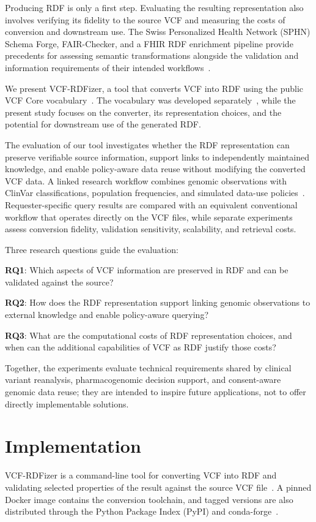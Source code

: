 \documentclass[pdflatex,sn-mathphys-num,referee]{sn-jnl}
\begin{document}
Producing RDF is only a first step.
Evaluating the resulting representation also involves verifying its fidelity to the source VCF and measuring the costs of conversion and downstream use.
The Swiss Personalized Health Network (SPHN) Schema Forge, FAIR-Checker, and a FHIR RDF enrichment pipeline provide precedents for assessing semantic transformations alongside the validation and information requirements of their intended workflows~\cite{toure2025forge,gaignard2023fairchecker,ansari2025etl}.

We present VCF-RDFizer, a tool that converts VCF into RDF using the public VCF Core vocabulary~\cite{vcfc210}.
The vocabulary was developed separately~\cite{crum_vcfcore_2027}, while the present study focuses on the converter, its representation choices, and the potential for downstream use of the generated RDF.

The evaluation of our tool investigates whether the RDF representation can preserve verifiable source information, support links to independently maintained knowledge, and enable policy-aware data reuse without modifying the converted VCF data.
A linked research workflow combines genomic observations with ClinVar classifications, population frequencies, and simulated data-use policies~\cite{landrum2018clinvar}.
Requester-specific query results are compared with an equivalent conventional workflow that operates directly on the VCF files, while separate experiments assess conversion fidelity, validation sensitivity, scalability, and retrieval costs.

Three research questions guide the evaluation:

\textbf{RQ1}: Which aspects of VCF information are preserved in RDF and can be validated against the source?

\textbf{RQ2}: How does the RDF representation support linking genomic observations to external knowledge and enable policy-aware querying?

\textbf{RQ3}: What are the computational costs of RDF representation choices, and when can the additional capabilities of VCF as RDF justify those costs?

Together, the experiments evaluate technical requirements shared by clinical variant reanalysis, pharmacogenomic decision support, and consent-aware genomic data reuse; they are intended to inspire future applications, not to offer directly implementable solutions.


\section{Implementation}\label{sec:implementation}
VCF-RDFizer is a command-line tool for converting VCF into RDF and validating selected properties of the result against the source VCF file~\cite{vcfrdfizer_repo}.
A pinned Docker image contains the conversion toolchain, and tagged versions are also distributed through the Python Package Index (PyPI) and conda-forge~\cite{vcfrdfizer_docker,vcfrdfizer_pypi,vcfrdfizer_conda}.
\end{document}
